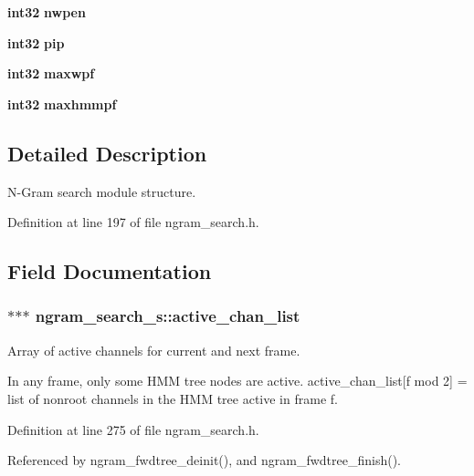 \begin{DoxyCompactItemize}
\item 
{\bf int32} {\bfseries nwpen}\label{structngram__search__s_a194ea45ae0b6866cb0a734061c5224e8}

\item 
{\bf int32} {\bfseries pip}\label{structngram__search__s_a854e8b60f779a4201aab3788943e7f76}

\item 
{\bf int32} {\bfseries maxwpf}\label{structngram__search__s_ae40b3a2caa5bbb523cce35dda4290d02}

\item 
{\bf int32} {\bfseries maxhmmpf}\label{structngram__search__s_a75f2eeaedf27926e9d0b76a23acbc9ff}

\end{DoxyCompactItemize}


\subsection{\-Detailed \-Description}
\-N-\/\-Gram search module structure. 

\-Definition at line 197 of file ngram\-\_\-search.\-h.



\subsection{\-Field \-Documentation}
\subsubsection[{active\-\_\-chan\-\_\-list}]{$\ast$$\ast$$\ast$ {\bf ngram\-\_\-search\-\_\-s\-::active\-\_\-chan\-\_\-list}}\label{structngram__search__s_a83731bf0e2234e632c5e78f2321f5b2d}


\-Array of active channels for current and next frame. 

\-In any frame, only some \-H\-M\-M tree nodes are active. active\-\_\-chan\-\_\-list[f mod 2] = list of nonroot channels in the \-H\-M\-M tree active in frame f. 

\-Definition at line 275 of file ngram\-\_\-search.\-h.



\-Referenced by ngram\-\_\-fwdtree\-\_\-deinit(), and ngram\-\_\-fwdtree\-\_\-finish().

